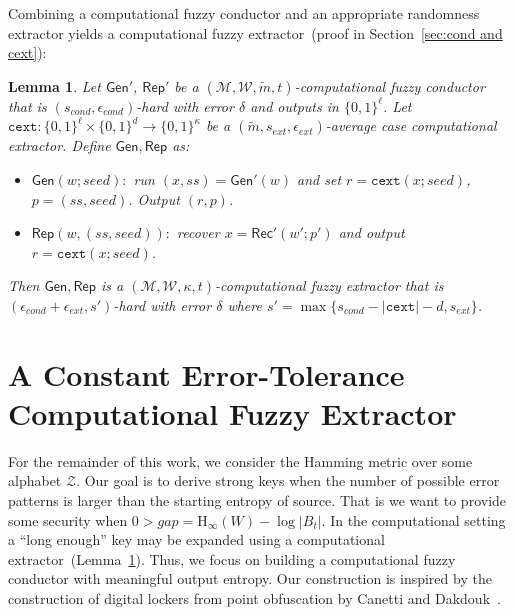 \documentclass[11pt]{article}
\newcommand{\secref}[1]{\mbox{Section~\ref{#1}}}
\newcommand{\lemref}[1]{\mbox{Lemma~\ref{#1}}}
\newcommand{\class}[1]{{\ensuremath{\mathsf{#1}}}}
\newcommand{\gen}{\ensuremath{\class{Gen}}\xspace}
\newcommand{\rep}{\ensuremath{\class{Rep}}\xspace}
\newcommand{\rec}{\ensuremath{\class{Rec}}\xspace}
\newcommand{\zo}{\ensuremath{\{0, 1\}}}
\newcommand{\Hoo}{\mathrm{H}_\infty}
\newcommand{\cext}{\ensuremath{\mathtt{cext}}}
\newtheorem{lemma}[theorem]{Lemma}
\begin{document}
Combining a computational fuzzy conductor and an appropriate randomness extractor yields a computational fuzzy extractor~(proof in \secref{sec:cond and cext}):

\begin{lemma}
\label{lem:cond and cext}
Let $\gen'$, $\rep'$ be a $(\mathcal{M}, \mathcal{W}, \tilde{m}, t)$-computational fuzzy conductor that is $(s_{cond},\epsilon_{cond})$-hard with error $\delta$ and outputs in $\zo^\ell$.  Let $\cext:\zo^\ell\times \zo^d\rightarrow \zo^\kappa$ be a $(\tilde{m}, s_{ext}, \epsilon_{ext})$-average case computational extractor.  Define $\gen, \rep$ as:
\begin{itemize}
\item $\gen(w; seed):$ run $(x, ss)= \gen'(w)$ and set $r = \cext(x; seed)$, $p = (ss, seed)$.  Output $(r, p)$.
\item $\rep(w, (ss, seed)):$ recover $x = \rec'(w'; p')$ and output $r = \cext(x; seed)$.
\end{itemize}
Then $\gen, \rep$ is a $(\mathcal{M}, \mathcal{W}, \kappa, t)$-computational fuzzy extractor that is $(\epsilon_{cond}+\epsilon_{ext}, s')$-hard with error $\delta$ where $s' = \max\{s_{cond} - |\cext| -d, s_{ext}\}$.
\end{lemma}


\section{A Constant Error-Tolerance Computational Fuzzy Extractor}
\label{sec:construction}
For the remainder of this work, we consider the Hamming metric over some alphabet $\mathcal{Z}$.  Our goal is to derive strong keys when the number of possible error patterns is larger than the starting entropy of source.  That is we want to provide some security when $0>gap = \Hoo(W) - \log|B_t|$.
In the computational setting a ``long enough'' key may be expanded using a computational extractor~(\lemref{lem:cond and cext}).  Thus, we focus on building a computational fuzzy conductor with meaningful output entropy.  Our construction is inspired by the construction of digital lockers from point obfuscation by Canetti and Dakdouk~\cite{canetti2008obfuscating}.  
\end{document}
